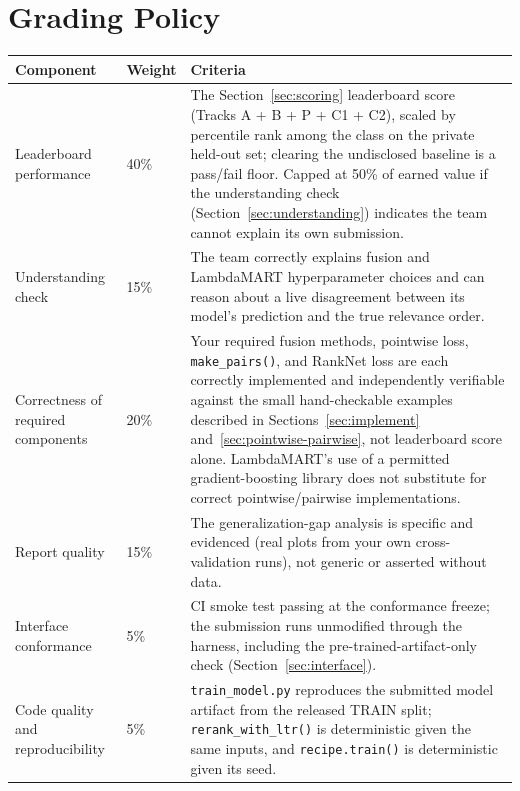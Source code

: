 \documentclass[10pt]{article}
\begin{document}
\section{Grading Policy}
\label{sec:grading}

\begin{center}
\begin{tabular}{|p{3.5cm}|p{1.5cm}|p{9.5cm}|}
\hline
\textbf{Component} & \textbf{Weight} & \textbf{Criteria}\\
\hline
Leaderboard performance & 40\% &
The Section~\ref{sec:scoring} leaderboard score (Tracks A + B + P + C1 + C2), scaled by percentile rank among the class on the private held-out set; clearing the undisclosed baseline is a pass/fail floor. Capped at 50\% of earned value if the understanding check (Section~\ref{sec:understanding}) indicates the team cannot explain its own submission.\\
\hline
Understanding check & 15\% &
The team correctly explains fusion and LambdaMART hyperparameter choices and can reason about a live disagreement between its model's prediction and the true relevance order.\\
\hline
Correctness of required components & 20\% &
Your required fusion methods, pointwise loss, \texttt{make\_pairs()}, and RankNet loss are each correctly implemented and independently verifiable against the small hand-checkable examples described in Sections~\ref{sec:implement} and~\ref{sec:pointwise-pairwise}, not leaderboard score alone. LambdaMART's use of a permitted gradient-boosting library does not substitute for correct pointwise/pairwise implementations.\\
\hline
Report quality & 15\% &
The generalization-gap analysis is specific and evidenced (real plots from your own cross-validation runs), not generic or asserted without data.\\
\hline
Interface conformance & 5\% &
CI smoke test passing at the conformance freeze; the submission runs unmodified through the harness, including the pre-trained-artifact-only check (Section~\ref{sec:interface}).\\
\hline
Code quality and reproducibility & 5\% &
\texttt{train\_model.py} reproduces the submitted model artifact from the released TRAIN split; \texttt{rerank\_with\_ltr()} is deterministic given the same inputs, and \texttt{recipe.train()} is deterministic given its seed.\\
\hline
\end{tabular}
\end{center}
\end{document}
